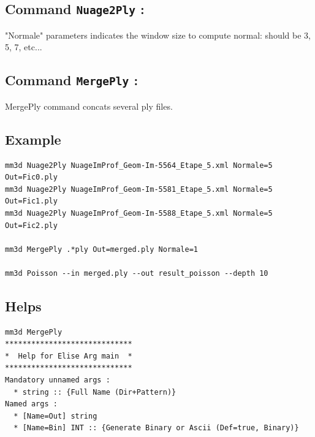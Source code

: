 \subsection{Command {\tt Nuage2Ply} :}

"Normale" parameters indicates the window size to compute normal: should be 3, 5, 7, etc...

\subsection{Command {\tt MergePly} :}

MergePly command concats several ply files.

\subsection{Example}

\begin{verbatim}
mm3d Nuage2Ply NuageImProf_Geom-Im-5564_Etape_5.xml Normale=5 Out=Fic0.ply
mm3d Nuage2Ply NuageImProf_Geom-Im-5581_Etape_5.xml Normale=5 Out=Fic1.ply
mm3d Nuage2Ply NuageImProf_Geom-Im-5588_Etape_5.xml Normale=5 Out=Fic2.ply

mm3d MergePly .*ply Out=merged.ply Normale=1

mm3d Poisson --in merged.ply --out result_poisson --depth 10
\end{verbatim}

\subsection{Helps}

\begin{verbatim}
mm3d MergePly
*****************************
*  Help for Elise Arg main  *
*****************************
Mandatory unnamed args :
  * string :: {Full Name (Dir+Pattern)}
Named args :
  * [Name=Out] string
  * [Name=Bin] INT :: {Generate Binary or Ascii (Def=true, Binary)}
\end{verbatim}

